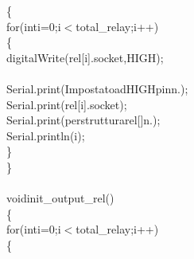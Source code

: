 \documentclass[a4paper, 12pt]{article}
\newcommand\SPC{\hspace*{0.6em}}
\newcommand\QOT{\mbox{\char 34}}
\newcommand{\CppAIdentifier}[1]{\textcolor[rgb]{0,1,0}{#1}}
\newcommand{\CppANumber}[1]{\textcolor[rgb]{0,0,1}{#1}}
\newcommand{\CppAReservedWord}[1]{\textcolor[rgb]{0,0.5,0}{#1}}
\newcommand{\CppASpace}[1]{\textcolor[rgb]{1,1,1}{\colorbox[rgb]{0,0,0}{#1}}}
\newcommand{\CppAString}[1]{\textcolor[rgb]{0.76,0.76,0.76}{#1}}
\newcommand{\CppASymbol}[1]{\textcolor[rgb]{1,0,0}{#1}}
\begin{document}
\begin{ttfamily}
\CppASymbol{\{}\\
\CppASpace{\SPC \SPC }\CppAReservedWord{for}\CppASpace{\SPC }\CppASymbol{(}\CppAReservedWord{int}\CppASpace{\SPC }\CppAIdentifier{i}\CppASymbol{=}\CppANumber{0}\CppASymbol{;}\CppASpace{\SPC }\CppAIdentifier{i}\CppASymbol{$<$}\CppAIdentifier{total\_relay}\CppASpace{\SPC }\CppASymbol{;}\CppAIdentifier{i}\CppASymbol{++}\CppASymbol{)}\\
\CppASpace{\SPC \SPC }\CppASymbol{\{}\\
\CppASpace{\SPC \SPC \SPC }\CppAIdentifier{digitalWrite}\CppASymbol{(}\CppAIdentifier{rel}\CppASymbol{[}\CppAIdentifier{i}\CppASymbol{]}\CppASymbol{.}\CppAIdentifier{socket}\CppASymbol{,}\CppASpace{\SPC }\CppAIdentifier{HIGH}\CppASymbol{)}\CppASymbol{;}\\
\CppASpace{\SPC \SPC \SPC }\\
\CppASpace{\SPC \SPC \SPC }\CppAIdentifier{Serial}\CppASymbol{.}\CppAIdentifier{print}\CppASymbol{(}\CppAString{\QOT Impostato\SPC ad\SPC HIGH\SPC pin\SPC n.\SPC \QOT }\CppASymbol{)}\CppASymbol{;}\\
\CppASpace{\SPC \SPC \SPC }\CppAIdentifier{Serial}\CppASymbol{.}\CppAIdentifier{print}\CppASymbol{(}\CppAIdentifier{rel}\CppASymbol{[}\CppAIdentifier{i}\CppASymbol{]}\CppASymbol{.}\CppAIdentifier{socket}\CppASymbol{)}\CppASymbol{;}\\
\CppASpace{\SPC \SPC \SPC }\CppAIdentifier{Serial}\CppASymbol{.}\CppAIdentifier{print}\CppASymbol{(}\CppAString{\QOT \SPC per\SPC struttura\SPC rel[]\SPC n.\SPC \QOT }\CppASymbol{)}\CppASymbol{;}\\
\CppASpace{\SPC \SPC \SPC }\CppAIdentifier{Serial}\CppASymbol{.}\CppAIdentifier{println}\CppASymbol{(}\CppAIdentifier{i}\CppASymbol{)}\CppASymbol{;}\\
\CppASpace{\SPC \SPC }\CppASymbol{\}}\\
\CppASymbol{\}}\\
\\
\CppAReservedWord{void}\CppASpace{\SPC }\CppAIdentifier{init\_output\_rel}\CppASymbol{(}\CppASymbol{)}\\
\CppASymbol{\{}\\
\CppASpace{\SPC \SPC }\CppAReservedWord{for}\CppASpace{\SPC }\CppASymbol{(}\CppAReservedWord{int}\CppASpace{\SPC }\CppAIdentifier{i}\CppASymbol{=}\CppANumber{0}\CppASymbol{;}\CppASpace{\SPC }\CppAIdentifier{i}\CppASymbol{$<$}\CppAIdentifier{total\_relay}\CppASpace{\SPC }\CppASymbol{;}\CppAIdentifier{i}\CppASymbol{++}\CppASymbol{)}\\
\CppASpace{\SPC \SPC \SPC }\CppASymbol{\{}\\

\end{ttfamily}
\end{document}
